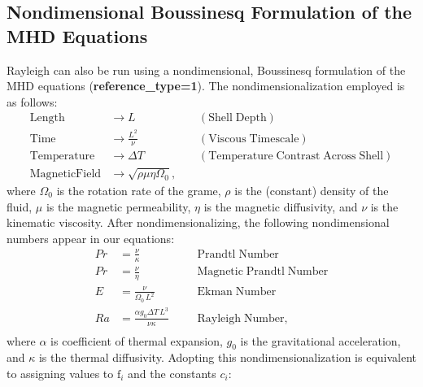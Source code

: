 \documentclass[10pt, letterpaper]{article}
\newcommand{\ff}{\mathrm{f}}
\begin{document}
\subsection{Nondimensional Boussinesq Formulation of the MHD Equations}
Rayleigh can also be run using a nondimensional, Boussinesq formulation of the MHD equations (\textbf{reference\_type=1}).  The nondimensionalization employed is as follows: 
\begin{align*}
\mathrm{Length} &\rightarrow L &\;\;\;\; \mathrm{(Shell\; Depth)} \\
\mathrm{Time} &\rightarrow   \frac{L^2}{\nu} &\;\;\;\; \mathrm{(Viscous\; Timescale)}\\
\mathrm{Temperature} &\rightarrow \Delta T&\;\;\;\; \mathrm{(Temperature\; Contrast\; Across\; Shell)} \\
\mathrm{Magnetic Field} &\rightarrow \sqrt{\rho\mu\eta\Omega_0},
\end{align*}
where $\Omega_0$ is the rotation rate of the grame, $\rho$ is the (constant) density of the fluid, $\mu$ is the magnetic permeability, $\eta$ is the magnetic diffusivity, and $\nu$ is the kinematic viscosity.  After nondimensionalizing, the following nondimensional numbers appear in our equations:
\begin{align*}
Pr &=\frac{\nu}{\kappa}                          &\;\;\;\;\;\; \mathrm{Prandtl\; Number} \\
Pr &=\frac{\nu}{\eta}                            &\;\;\;\;\;\; \mathrm{Magnetic\; Prandtl\; Number} \\
E  &=\frac{\nu}{\Omega_0\,L^2}                   &\;\;\;\;\;\; \mathrm{Ekman\; Number} \\
Ra &=\frac{\alpha g_0 \Delta T\,L^3}{\nu\kappa}  &\;\;\;\;\;\; \mathrm{Rayleigh\; Number}, \\
\end{align*}
where $\alpha$ is coefficient of thermal expansion, $g_0$ is the gravitational acceleration, and $\kappa$ is the thermal diffusivity.  Adopting this nondimensionalization is equivalent to assigning values to $\ff_i$ and the constants $c_i$:
\end{document}
